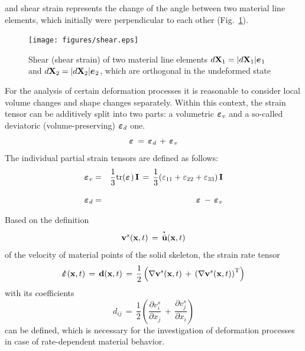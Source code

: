 and shear strain represents the change of the angle between two material line elements, which initially were perpendicular to each other (Fig.~\ref{fig:shear}).
\begin{figure}[htb!]
\begin{center}
\footnotesize
\texttt{[image: figures/shear.eps]}
\caption{Shear (shear strain) of two material line elements $d\mathbf{X}_1=\vert d\mathbf{X}_1\vert\mbox{${\mbox{\boldmath${e}$\unboldmath}}_{\:\!1}$}$ and $d\mathbf{X}_2=\vert d\mathbf{X}_2\vert\mbox{${\mbox{\boldmath${e}$\unboldmath}}_{\:\!2}$}$, which are orthogonal in the undeformed state \cite{Haupt:2002}}
\label{fig:shear}
\end{center}
\end{figure}

For the analysis of certain deformation processes it is reasonable to consider local volume changes and shape changes separately. Within this context, the strain tensor can be additively split into two parts: a volumetric $\mbox{${\mbox{\boldmath${\varepsilon}$\unboldmath}}_{\:\!v}$}$ and a so-called deviatoric (volume-preserving) $\mbox{${\mbox{\boldmath${\varepsilon}$\unboldmath}}_{\:\!d}$}$ one.
\begin{equation}
\miu{\varepsilon}{}{}\,=\,\miu{\varepsilon}{d}{}\,+\,\miu{\varepsilon}{v}{}
\label{eq:strainsplit}
\end{equation}
The individual partial strain tensors are defined as follows:
\begin{eqnarray}
\miu{\varepsilon}{v}{} & = & \frac{1}{3}\mathrm{tr}(\miu{\varepsilon}{}{})\,\mathbf{I}\,=\,
\frac{1}{3}(\varepsilon_{11}+\varepsilon_{22}+\varepsilon_{33})\,\mathbf{I}
\label{eq:devstrain}
 \\[2.0ex]
\miu{\varepsilon}{d}{} & = & \miu{\varepsilon}{}{}\,-\,\miu{\varepsilon}{v}{}
\label{eq:volstrain}
\end{eqnarray}

Based on the definition
\begin{equation}
\mathbf{v}^s(\mathbf{x},t)\,=\,\mathop{\bar{\mathbf{u}}}\limits^{\miu{.}{}{}}(\mathbf{x},t)
\label{eq:solidveloc}
\end{equation}
of the velocity of material points of the solid skeleton, the strain rate tensor
\begin{equation}
\miu{\varepsilon}{}{\dot}(\mathbf{x},t)\,=\,\mathbf{d}(\mathbf{x},t)\,=\,\frac{1}{2}
\left(\nabla\mathbf{v}^s(\mathbf{x},t)\,+\,\left(\nabla\mathbf{v}^s(\mathbf{x},t)\right)^{\mathrm{T}}\right)
\label{eq:strainratetens}
\end{equation}
with its coefficients
\begin{equation}
d_{ij}\,=\,
\frac{1}{2}\left(\frac{\partial v^s_i}{\partial x_j}\,+\,\frac{\partial v^s_j}{\partial x_i}\right)
\label{eq:strainratecoeff}
\end{equation}
can be defined, which is necessary for the investigation of deformation processes in case of rate-dependent material behavior.

